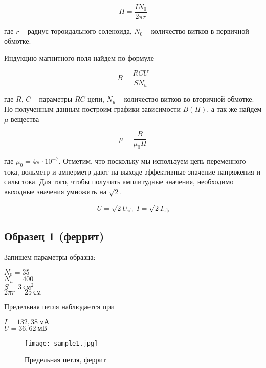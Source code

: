 \begin{equation}
	H = \frac{I N_0}{2 \pi r}
\end{equation}

где $r$ -- радиус тороидального соленоида, $N_0$ -- количество витков в первичной обмотке.

Индукцию магнитного поля найдем по формуле

\begin{equation}
	B = \frac{R C U}{S N_u}
\end{equation}

где $R$, $C$ -- параметры $RC$-цепи, $N_u$ -- количество витков во вторичной обмотке.
По полученным данным построим графики зависимости $B(H)$, а так же найдем $\mu$ вещества

\begin{equation}
	\mu = \frac{B}{\mu_0 H}
\end{equation}

где $\mu_0 = 4 \pi \cdot 10^{-7}$.
Отметим, что поскольку мы используем цепь переменного тока, вольметр и амперметр дают на выходе
эффективные значение напряжения и силы тока. Для того, чтобы получить амплитудные значения,
необходимо выходные значения умножить на $\sqrt{2}$.

\begin{equation}
	U = \sqrt{2} U_{\text{эф}} ~~
	I = \sqrt{2} I_{\text{эф}}
\end{equation}

\subsection{Образец 1 (феррит)}

Запишем параметры образца:

\begin{center}
	$N_0 = 35$                 \\
	$N_u = 400$                \\
	$S = 3 ~ \text{см}^2$      \\
	$2 \pi r = 25 ~ \text{см}$
\end{center}

Предельная петля наблюдается при 

\begin{center}
	$I = 132,38 ~ \text{мА}$ \\
	$U = 36,62 ~ \text{мВ}$
\end{center}

\begin{figure}[h!]
	\centering
	\texttt{[image: sample1.jpg]}
	\caption{Предельная петля, феррит}
	\label{sample1_pic}
\end{figure}

